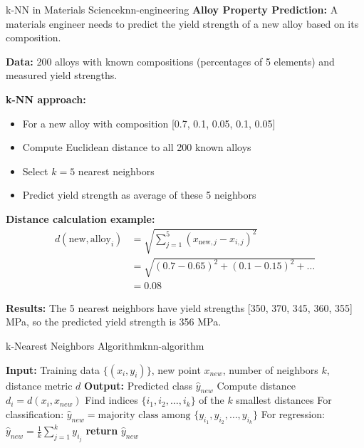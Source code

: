 \documentclass[12pt]{article}
\begin{document}
\begin{example}{k-NN in Materials Science}{knn-engineering}
\textbf{Alloy Property Prediction:} A materials engineer needs to predict the yield strength of a new alloy based on its composition.

\textbf{Data:} 200 alloys with known compositions (percentages of 5 elements) and measured yield strengths.

\textbf{k-NN approach:}
\begin{itemize}
    \item For a new alloy with composition [0.7, 0.1, 0.05, 0.1, 0.05]
    \item Compute Euclidean distance to all 200 known alloys
    \item Select $k=5$ nearest neighbors
    \item Predict yield strength as average of these 5 neighbors
\end{itemize}

\textbf{Distance calculation example:}
\begin{align}
d(\text{new}, \text{alloy}_i) &= \sqrt{\sum_{j=1}^5 (x_{\text{new},j} - x_{i,j})^2} \\
&= \sqrt{(0.7-0.65)^2 + (0.1-0.15)^2 + \ldots} \\
&= 0.08
\end{align}

\textbf{Results:} The 5 nearest neighbors have yield strengths [350, 370, 345, 360, 355] MPa, so the predicted yield strength is 356 MPa.

\begin{center}
\end{center}
\end{example}

\begin{algorithmenv}{k-Nearest Neighbors Algorithm}{knn-algorithm}
\begin{algorithmic}[1]
\State \textbf{Input:} Training data $\{(x_i, y_i)\}$, new point $x_{new}$, number of neighbors $k$, distance metric $d$
\State \textbf{Output:} Predicted class $\hat{y}_{new}$
    \State Compute distance $d_i = d(x_i, x_{new})$
\EndFor
\State Find indices $\{i_1, i_2, \ldots, i_k\}$ of the $k$ smallest distances
\State For classification: $\hat{y}_{new} = \text{majority class among } \{y_{i_1}, y_{i_2}, \ldots, y_{i_k}\}$
\State For regression: $\hat{y}_{new} = \frac{1}{k}\sum_{j=1}^k y_{i_j}$
\State \textbf{return} $\hat{y}_{new}$
\end{algorithmic}
\end{algorithmenv}
\end{document}
